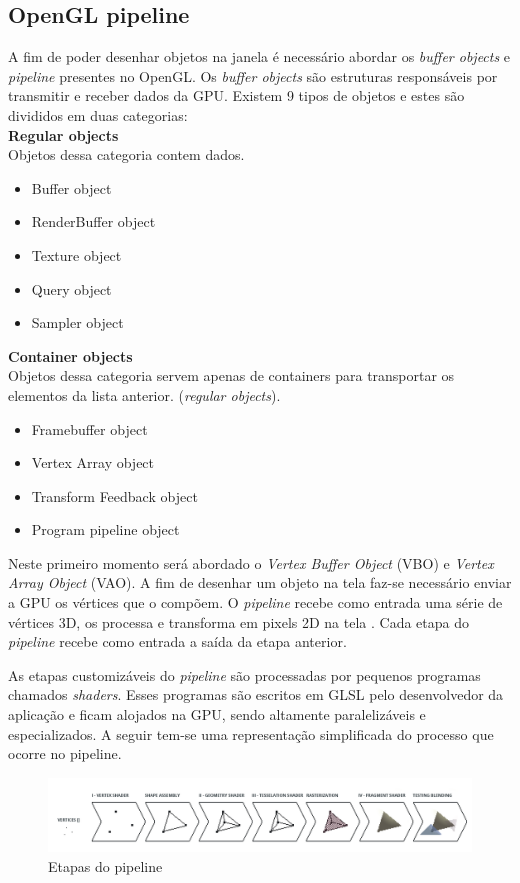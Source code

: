 \documentclass[12pt, 
openright, 
oneside, 
a4paper,    
brazil]{facom-ufu-abntex2}
\begin{document}
\subsection{OpenGL pipeline}
A fim de poder desenhar objetos na janela é necessário abordar os \textit{buffer objects} e \textit{pipeline} presentes no OpenGL. Os \textit{buffer objects} são estruturas responsáveis por transmitir e receber dados da GPU. Existem 9 tipos de objetos e estes são divididos em duas categorias:
\\ \textbf{Regular objects}
\\ Objetos dessa categoria contem dados.
\begin{itemize}
\item Buffer object
\item RenderBuffer object
\item Texture object
\item Query object
\item Sampler object
\end{itemize}
\textbf{Container objects}
\\ Objetos dessa categoria servem apenas de containers para transportar os elementos da lista anterior. (\textit{regular objects}). 
\begin{itemize}
\item Framebuffer object
\item Vertex Array object
\item Transform Feedback object
\item Program pipeline object
\end{itemize}

Neste primeiro momento será abordado o \textit{Vertex Buffer Object} (VBO) e \textit{Vertex Array Object} (VAO). A fim de desenhar um objeto na tela faz-se necessário enviar a GPU os vértices que o compõem. O \textit{pipeline} recebe como entrada uma série de vértices 3D, os processa e transforma em pixels 2D na tela \cite{LearnOpenGL}. Cada etapa do \textit{pipeline} recebe como entrada a saída da etapa anterior.

As etapas customizáveis do \textit{pipeline} são processadas por pequenos programas chamados \textit{shaders}. Esses programas são escritos em GLSL pelo desenvolvedor da aplicação e ficam alojados na GPU, sendo altamente paralelizáveis e especializados. A seguir tem-se uma representação simplificada do processo que ocorre no pipeline.

\begin{figure}[H]
	\centering
	\includegraphics[width=\textwidth]{imagens/openglpipeline.png}
	\caption{Etapas do pipeline  \label{fig:pipeline}}
\end{figure}
\end{document}

